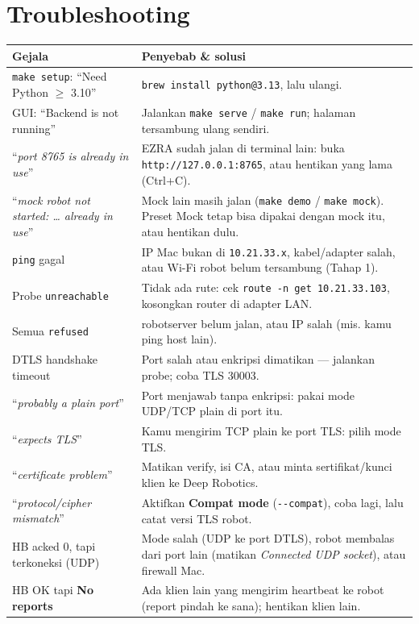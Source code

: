 \documentclass[11pt,a4paper]{article}
\newcommand{\code}[1]{\texttt{#1}}
\newcommand{\ui}[1]{\textbf{#1}}
\begin{document}
\section{Troubleshooting}\label{sec:trouble}
\begin{xltabular}{\linewidth}{@{}L{54mm}Y@{}}
\toprule
\textbf{Gejala} & \textbf{Penyebab \& solusi}\\\midrule
\endhead
\code{make setup}: ``Need Python $\geq$ 3.10'' & \code{brew install python@3.13}, lalu ulangi.\\
GUI: ``Backend is not running'' & Jalankan \code{make serve} / \code{make run}; halaman tersambung ulang sendiri.\\
``\emph{port 8765 is already in use}'' & EZRA sudah jalan di terminal lain: buka \code{http://127.0.0.1:8765}, atau hentikan yang lama (Ctrl+C).\\
``\emph{mock robot not started: \ldots{} already in use}'' & Mock lain masih jalan (\code{make demo} / \code{make mock}). Preset Mock tetap bisa dipakai dengan mock itu, atau hentikan dulu.\\
\code{ping} gagal & IP Mac bukan di \code{10.21.33.x}, kabel/adapter salah, atau Wi-Fi robot belum tersambung (Tahap 1).\\
Probe \code{unreachable} & Tidak ada rute: cek \code{route -n get 10.21.33.103}, kosongkan router di adapter LAN.\\
Semua \code{refused} & robotserver belum jalan, atau IP salah (mis. kamu ping host lain).\\
DTLS handshake timeout & Port salah atau enkripsi dimatikan --- jalankan probe; coba TLS 30003.\\
``\emph{probably a plain port}'' & Port menjawab tanpa enkripsi: pakai mode UDP/TCP plain di port itu.\\
``\emph{expects TLS}'' & Kamu mengirim TCP plain ke port TLS: pilih mode TLS.\\
``\emph{certificate problem}'' & Matikan verify, isi CA, atau minta sertifikat/kunci klien ke Deep Robotics.\\
``\emph{protocol/cipher mismatch}'' & Aktifkan \ui{Compat mode} (\code{-{}-compat}), coba lagi, lalu catat versi TLS robot.\\
HB acked 0, tapi terkoneksi (UDP) & Mode salah (UDP ke port DTLS), robot membalas dari port lain (matikan \emph{Connected UDP socket}), atau firewall Mac.\\
HB OK tapi \ui{No reports} & Ada klien lain yang mengirim heartbeat ke robot (report pindah ke sana); hentikan klien lain.\\

\end{xltabular}
\end{document}
